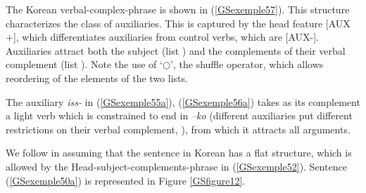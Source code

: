 \documentclass[output=paper]{langsci/langscibook}
\begin{document}
{The Korean verbal-complex-phrase is shown in (\ref{GSexemple57}). This structure characterizes the class of auxiliaries. This is captured by the head feature [AUX +], which differentiates auxiliaries from control verbs, which are [AUX-]. Auxiliaries attract both the subject (list ) and the complements of their verbal complement (list ). Note the use of `$\bigcirc$', the shuffle operator, which allows reordering of the elements of the two lists.

\begin{exe}
    \label{GSexemple57}
\end{exe}

The auxiliary \textit{iss-} in (\ref{GSexemple55a}), (\ref{GSexemple56a}) takes as its complement a light verb which is constrained to end in \textit{–ko} (different auxiliaries put different restrictions on their verbal complement, \citealt{Yoo2003}), from which it attracts all arguments. 

We follow \cite{CC1998} in assuming that the sentence in Korean has a flat structure, which is allowed by the Head-subject-complements-phrase in (\ref{GSexemple52}). Sentence (\ref{GSexemple50a}) is represented in Figure \ref{GSfigure12}.

}
\end{document}
